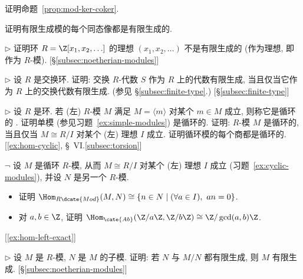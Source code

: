 \begin{prob}
\label{ex:prop-6-2}
证明命题~\ref{prop:mod-ker-coker}.
\end{prob}

\begin{prob}
\label{ex:fg-image}
证明有限生成模的每个同态像都是有限生成的.
\end{prob}

\begin{prob}
\label{ex:ideal-not-fg}
$\triangleright$ 证明环 $R = \Z[x_1, x_2, \ldots]$ 的理想 $(x_1, x_2, \ldots)$ 不是有限生成的 (作为理想, 即作为 $R$-模). [\S\ref{subsec:noetherian-modules}]
\end{prob}

\begin{prob}
\label{ex:alg-fg}
$\triangleright$ 设 $R$ 是交换环. 证明: 交换 $R$-代数 $S$ 作为 $R$ 上的代数有限生成, 当且仅当它作为 $R$ 上的交换代数有限生成. (参见 \S\ref{subsec:finite-type}.) [\S\ref{subsec:finite-type}]
\end{prob}

\begin{prob}
\label{ex:cyclic-modules}
$\triangleright$ 设 $R$ 是环. 若 (左) $R$-模 $M$ 满足 $M = \langle m \rangle$ 对某个 $m \in M$ 成立, 则称它是循环的%
. 证明单模 (参见习题~\ref{ex:simple-modules}) 是循环的. 证明: $R$-模 $M$ 是循环的, 当且仅当 $M \cong R/I$ 对某个 (左) 理想 $I$ 成立. 证明循环模的每个商都是循环的. [\ref{ex:hom-cyclic}, \S~VI.\ref{subsec:torsion}]
\end{prob}

\begin{prob}
\label{ex:hom-cyclic}
$\neg$ 设 $M$ 是循环 $R$-模, 从而 $M \cong R/I$ 对某个 (左) 理想 $I$ 成立 (习题~\ref{ex:cyclic-modules}), 并设 $N$ 是另一个 $R$-模.
\begin{itemize}
	\item 证明 $\Hom_{R\dcate{Mod}}(M, N) \cong \{n \in N \mid (\forall a \in I),\ an = 0\}$.
	\item 对 $a, b \in \Z$, 证明 $\Hom_{\cate{Ab}}(\Z/a\Z, \Z/b\Z) \cong \Z/\gcd(a,b)\Z$.
\end{itemize}
[\ref{ex:hom-left-exact}]
\end{prob}

\begin{prob}
\label{ex:fg-extension}
$\triangleright$ 设 $M$ 是 $R$-模, $N$ 是 $M$ 的子模. 证明: 若 $N$ 与 $M/N$ 都有限生成, 则 $M$ 有限生成. [\S\ref{subsec:noetherian-modules}]
\end{prob}


